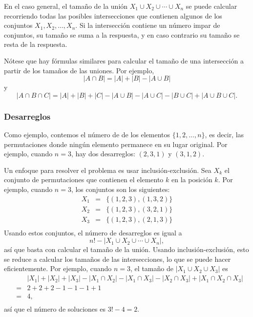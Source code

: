 En el caso general, el tamaño de la
unión $X_1 \cup X_2 \cup \cdots \cup X_n$
se puede calcular recorriendo todas las posibles
intersecciones que contienen algunos de los conjuntos $X_1,X_2,\ldots,X_n$.
Si la intersección contiene un número impar de conjuntos,
su tamaño se suma a la respuesta,
y en caso contrario su tamaño se resta de la respuesta.

Nótese que hay fórmulas similares
para calcular
el tamaño de una intersección a partir de los tamaños de
las uniones. Por ejemplo,
\[ |A \cap B| = |A| + |B| - |A \cup B|\]
y
\[ |A \cap B \cap C| = |A| + |B| + |C| - |A \cup B|  - |A \cup C|  - |B \cup C| + |A \cup B \cup C| .\]

\subsubsection{Desarreglos}


Como ejemplo, contemos el número de 
de los elementos $\{1,2,\ldots,n\}$, es decir, las permutaciones
donde ningún elemento permanece en su lugar original.
Por ejemplo, cuando $n=3$, hay
dos desarreglos: $(2,3,1)$ y $(3,1,2)$.

Un enfoque para resolver el problema es usar
inclusión-exclusión.
Sea $X_k$ el conjunto de permutaciones
que contienen el elemento $k$ en la posición $k$.
Por ejemplo, cuando $n=3$, los conjuntos son los siguientes:
\[
\begin{array}{lcl}
X_1 & = & \{(1,2,3),(1,3,2)\} \\
X_2 & = & \{(1,2,3),(3,2,1)\} \\
X_3 & = & \{(1,2,3),(2,1,3)\} \\
\end{array}
\]
Usando estos conjuntos, el número de desarreglos es igual a
\[ n! - |X_1 \cup X_2 \cup \cdots \cup X_n|, \]
así que basta con calcular el tamaño de la unión.
Usando inclusión-exclusión, esto se reduce a
calcular los tamaños de las intersecciones, lo que se puede
hacer eficientemente.
Por ejemplo, cuando $n=3$, el tamaño de
$|X_1 \cup X_2 \cup X_3|$ es
\[
\begin{array}{lcl}
 & & |X_1| + |X_2| + |X_3| - |X_1 \cap X_2|  - |X_1 \cap X_3|  - |X_2 \cap X_3| + |X_1 \cap X_2 \cap X_3| \\
 & = & 2+2+2-1-1-1+1 \\
 & = & 4, \\
\end{array}
\]
así que el número de soluciones es $3!-4=2$.

